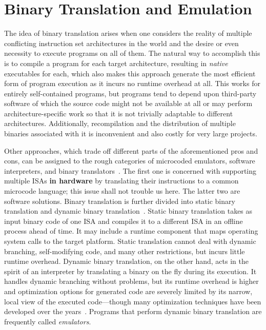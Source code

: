 \section{Binary Translation and Emulation}

The idea of binary translation arises when one considers the reality of multiple conflicting instruction set
architectures in the world and the desire or even necessity to execute programs on all of them. The natural way to
accomplish this is to compile a program for each target architecture, resulting in \textit{native} executables for each,
which also makes this approach generate the most efficient form of program execution as it incurs no runtime overhead at
all. This works for entirely self-contained programs, but programs tend to depend upon third-party software of which the
source code might not be available at all or may perform architecture-specific work so that it is not trivially
adaptable to different architectures. Additionally, recompilation and the distribution of multiple binaries associated
with it is inconvenient and also costly for very large projects.

Other approaches, which trade off different parts of the aforementioned pros and cons, can be assigned to the rough
categories of microcoded emulators, software interpreters, and binary translators~\cite{sites1993binary}. The first one
is concerned with supporting multiple \ac{ISA}s \textbf{in hardware} by translating their instructions to a common
microcode language; this issue shall not trouble us here. The latter two are software solutions. Binary translation is
further divided into static binary translation and dynamic binary translation~\cite{cifuentes1996staticdynamic,
Rocha2022Lasagne}. Static binary translation takes as input binary code of one \ac{ISA} and compiles it to a different
\ac{ISA} in an offline process ahead of time. It may include a runtime component that maps operating system calls to the
target platform. Static translation cannot deal with dynamic branching, self-modifying code, and many other
restrictions, but incurs little runtime overhead. Dynamic binary translation, on the other hand, acts in the spirit of
an interpreter by translating a binary on the fly during its execution. It handles dynamic branching without problems,
but its runtime overhead is higher and optimization options for generated code are severely limited by its narrow, local
view of the executed code---though many optimization techniques have been developed over the
years~\cite{Guan+2010DbtOptimizations, Sun+2023DbtBranchPred, Hawkins2015OptimizingDbt, Kedia+2013DbtKernel}. Programs
that perform dynamic binary translation are frequently called \textit{emulators}.
